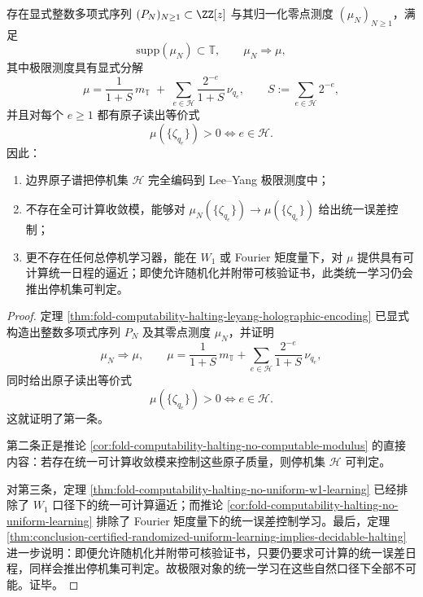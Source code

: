 \begin{theorem}\label{thm:conclusion-leyang-boundary-atomic-spectrum-unlearnability}
存在显式整数多项式序列 \((P_N)_{N\ge 1}\subset\ZZ[z]\) 与其归一化零点测度 \((\mu_N)_{N\ge 1}\)，满足
\[
\mathrm{supp}(\mu_N)\subset\mathbb T,
\qquad
\mu_N\Rightarrow \mu,
\]
其中极限测度具有显式分解
\[
\mu=\frac{1}{1+S}\,m_{\mathbb T}
\;+\;
\sum_{e\in\mathcal H}\frac{2^{-e}}{1+S}\,\nu_{q_e},
\qquad
S:=\sum_{e\in\mathcal H}2^{-e},
\]
并且对每个 \(e\ge 1\) 都有原子读出等价式
\[
\mu(\{\zeta_{q_e}\})>0
\iff
e\in\mathcal H.
\]
因此：
\begin{enumerate}
  \item 边界原子谱把停机集 \(\mathcal H\) 完全编码到 Lee--Yang 极限测度中；
  \item 不存在全可计算收敛模，能够对 \(\mu_N(\{\zeta_{q_e}\})\to \mu(\{\zeta_{q_e}\})\) 给出统一误差控制；
  \item 更不存在任何总停机学习器，能在 \(W_1\) 或 Fourier 矩度量下，对 \(\mu\) 提供具有可计算统一日程的逼近；即使允许随机化并附带可核验证书，此类统一学习仍会推出停机集可判定。
\end{enumerate}
\end{theorem}
\begin{proof}
定理 \ref{thm:fold-computability-halting-leyang-holographic-encoding} 已显式构造出整数多项式序列 \(P_N\) 及其零点测度 \(\mu_N\)，并证明
\[
\mu_N\Rightarrow \mu,
\qquad
\mu=\frac{1}{1+S}\,m_{\mathbb T}
+\sum_{e\in\mathcal H}\frac{2^{-e}}{1+S}\,\nu_{q_e},
\]
同时给出原子读出等价式
\[
\mu(\{\zeta_{q_e}\})>0\iff e\in\mathcal H.
\]
这就证明了第一条。

第二条正是推论 \ref{cor:fold-computability-halting-no-computable-modulus} 的直接内容：若存在统一可计算收敛模来控制这些原子质量，则停机集 \(\mathcal H\) 可判定。

对第三条，定理 \ref{thm:fold-computability-halting-no-uniform-w1-learning} 已经排除了 \(W_1\) 口径下的统一可计算逼近；而推论 \ref{cor:fold-computability-halting-no-uniform-learning} 排除了 Fourier 矩度量下的统一误差控制学习。最后，定理 \ref{thm:conclusion-certified-randomized-uniform-learning-implies-decidable-halting} 进一步说明：即便允许随机化并附带可核验证书，只要仍要求可计算的统一误差日程，同样会推出停机集可判定。故极限对象的统一学习在这些自然口径下全部不可能。证毕。
\end{proof}

